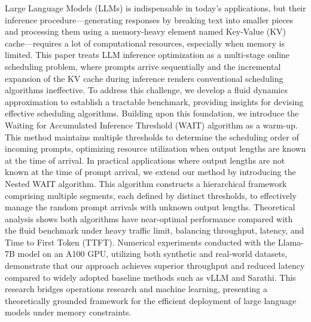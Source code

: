 Large Language Models (LLMs) is indispensable in today's applications, but their inference procedure—generating responses by breaking text into smaller pieces and processing them using a memory-heavy element named Key-Value (KV) cache—requires a lot of computational resources, especially when memory is limited. This paper treats LLM inference optimization as a multi-stage online scheduling problem, where prompts arrive sequentially and the incremental expansion of the KV cache during inference renders conventional scheduling algorithms ineffective. To address this challenge, we develop a fluid dynamics approximation to establish a tractable benchmark, providing insights for devising effective scheduling algorithms. Building upon this foundation, we introduce the Waiting for Accumulated Inference Threshold (WAIT) algorithm as a warm-up. This method maintains multiple thresholds to determine the scheduling order of incoming prompts, optimizing resource utilization when output lengths are known at the time of arrival. In practical applications where output lengths are not known at the time of prompt arrival, we extend our method by introducing the Nested WAIT algorithm. This algorithm constructs a hierarchical framework comprising multiple segments, each defined by distinct thresholds, to effectively manage the random prompt arrivals with unknown output lengths. Theoretical analysis shows both algorithms have near-optimal performance compared with the fluid benchmark under heavy traffic limit, balancing throughput, latency, and Time to First Token (TTFT). Numerical experiments conducted with the Llama-7B model on an A100 GPU, utilizing both synthetic and real-world datasets, demonstrate that our approach achieves superior throughput and reduced latency compared to widely adopted baseline methods such as vLLM and Sarathi. This research bridges operations research and machine learning, presenting a theoretically grounded framework for the efficient deployment of large language models under memory constraints.